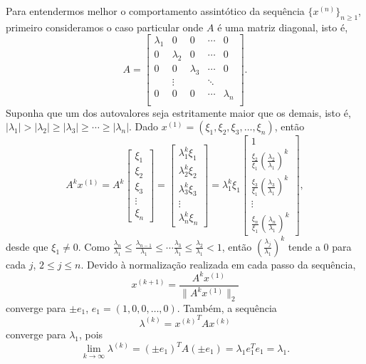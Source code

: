 Para entendermos melhor o comportamento assintótico da sequência $\{x^{(n)}\}_{n\geq 1}$, primeiro consideramos o caso particular onde $A$ é uma matriz diagonal, isto é,
\begin{equation}
  A=\begin{bmatrix}
    \lambda_1&0&0&\cdots&0\\
    0&\lambda_2&0&\cdots&0\\
    0&  0&\lambda_3&\cdots&0\\
    &\vdots& &\ddots&\\
    0&  0&0&\cdots&\lambda_n\\
  \end{bmatrix}.
\end{equation}
Suponha que um dos autovalores seja estritamente maior que os demais, isto é, $|\lambda_1|>|\lambda_2|\geq |\lambda_3|\geq \cdots\geq |\lambda_n|$. Dado $x^{(1)}=(\xi_1, \xi_2, \xi_3, \dotsc, \xi_n)$, então
\begin{equation}
  A^kx^{(1)} = A^k\begin{bmatrix}\xi_1\\ \xi_2\\ \xi_3\\ \vdots \\ \xi_n\end{bmatrix} = \begin{bmatrix}\lambda_1^k\xi_1\\ \lambda_2^k\xi_2\\ \lambda_3^k\xi_3\\ \vdots \\ \lambda_n^k\xi_n\end{bmatrix} = \lambda_1^k\xi_1\begin{bmatrix}1\\ \frac{\xi_2}{\xi_1}\left(\frac{\lambda_2}{\lambda_1}\right)^k\\ \frac{\xi_3}{\xi_1}\left(\frac{\lambda_3}{\lambda_1}\right)^k\\ \vdots \\ \frac{\xi_n}{\xi_1}\left(\frac{\lambda_n}{\lambda_1}\right)^k\end{bmatrix},
\end{equation}
desde que $\xi_1\neq 0$. Como $\frac{\lambda_n}{\lambda_1}\leq \frac{\lambda_{n-1}}{\lambda_1}\leq \cdots \frac{\lambda_3}{\lambda_1}\leq \frac{\lambda_2}{\lambda_1}<1$, então $\left(\frac{\lambda_j}{\lambda_1}\right)^k$ tende a $0$ para cada $j$, $2\leq j\leq n$. Devido à normalização realizada em cada passo da sequência,
\begin{equation}
  x^{(k+1)}=\frac{A^kx^{(1)}}{\|A^kx^{(1)}\|_2}
\end{equation}
converge para $\pm e_1$, $e_1=(1, 0, 0, \dotsc, 0)$. Também, a sequência
\begin{equation}
  \lambda^{(k)}={x^{(k)}}^TAx^{(k)}
\end{equation}
converge para $\lambda_1$, pois
\begin{equation}
  \lim_{k\to\infty}\lambda^{(k)}=(\pm e_1)^TA(\pm e_1)=\lambda_1e_1^Te_1=\lambda_1.
\end{equation}

